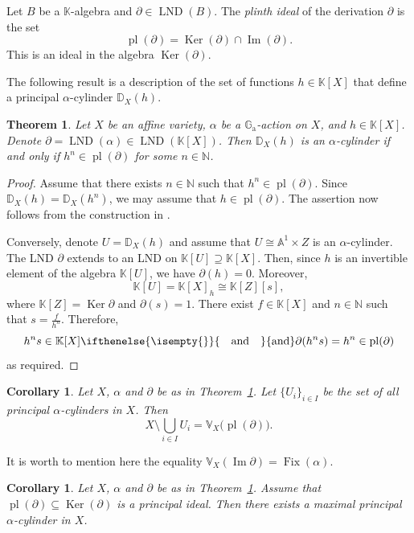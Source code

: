 \documentclass[a4paper, 12pt, reqno]{amsart}
\newcommand{\bb}{\mathbb}
\newcommand{\der}{\partial}
\newcommand{\Ga}{\bb{G}_\mathrm{a}}
\DeclareMathOperator{\Fix}{Fix}
\DeclareMathOperator{\mIm}{Im}
\renewcommand{\Im}{\mIm}
\DeclareMathOperator{\Ker}{Ker}
\DeclareMathOperator{\LND}{LND}
\DeclareMathOperator{\pl}{pl}
\newcommand{\insertText}[2][]{%
    \ifthenelse{\isempty{#1}}{%
        \quad \text{#2} \quad%
    }{%
        #1 \text{#2} #1%
    }%
}
\theoremstyle{definition}
\theoremstyle{plain}
\newtheorem{coro}[counter]{Corollary}
\newtheorem{theo}[counter]{Theorem}
\begin{document}
Let $B$ be a $\bb{K}$-algebra and $\der \in \LND(B)$. The \emph{plinth ideal} of the derivation $\der$ is the set
$$
\pl(\der) = \Ker(\der) \cap \Im(\der).
$$
This is an ideal in the algebra $\Ker(\der)$.

The following result is a description of the set of functions $h \in \bb{K}[X]$ that define a principal $\alpha$-cylinder $\bb{D}_X(h)$.

\begin{theo} \label{CPI.th}
Let $X$ be an affine variety, $\alpha$ be a $\Ga$-action on $X$, and $h \in \bb{K}[X]$. Denote $\der = \LND(\alpha) \in \LND(\bb{K}[X])$. Then $\bb{D}_X(h)$ is an $\alpha$-cylinder if and only if $h^n \in \pl(\der)$ for some $n \in \bb{N}$.
\end{theo}

\begin{proof}
Assume that there exists $n \in \bb{N}$ such that $h^n \in \pl(\der)$. Since $\bb{D}_X(h) = \bb{D}_X(h^n)$, we may assume that $h \in \pl(\der)$. The assertion now follows from the construction in \cite[Proposition~3.1.5]{KPZ11}.

Conversely, denote $U = \bb{D}_X(h)$ and assume that $U \cong \bb{A}^1 \times Z$ is an $\alpha$-cylinder. The LND $\der$ extends to an LND on $\bb{K}[U] \supseteq \bb{K}[X]$. Then, since $h$ is an invertible element of the algebra $\bb{K}[U]$, we have $\der(h) = 0$. Moreover,
$$
\bb{K}[U] = \bb{K}[X]_h \cong \bb{K}[Z][s],
$$
where $\bb{K}[Z] = \Ker \der$ and $\der(s) = 1$. There exist $f \in \bb{K}[X]$ and $n \in \bb{N}$ such that
$
s = \frac{f}{h^n}.
$
Therefore,
$$
h^n s \in \bb{K}[X]
\insertText{and}
\der(h^n s) = h^n \in \pl(\der)
$$
as required.
\end{proof}

\begin{coro} \label{UC.co}
Let $X$, $\alpha$ and $\der$ be as in Theorem~\ref{CPI.th}. Let $\{U_i\}_{i \in I}$ be the set of all principal $\alpha$-cylinders in $X$. Then
$$
X \setminus \bigcup_{i \in I} U_i =
\bb{V}_X \big( \pl(\der) \big).
$$
\end{coro}

It is worth to mention here the equality $\bb{V}_X(\Im \der) = \Fix(\alpha)$.

\begin{coro} \label{PPI.co}
Let $X$, $\alpha$ and $\der$ be as in Theorem~\ref{CPI.th}. Assume that $\pl(\der) \subseteq \Ker(\der)$ is a principal ideal. Then there exists a maximal principal $\alpha$-cylinder in $X$.
\end{coro}
\end{document}
